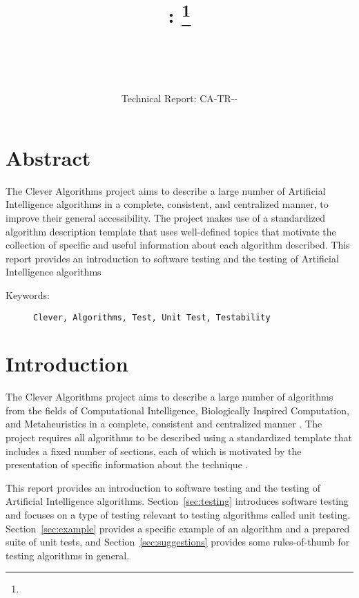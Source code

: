 \documentclass[a4paper, 11pt]{article}
\title{{\myreporttitle}: {\myreportsubtitle}\footnote{\myreportlicense}}
\author{\myreportauthor\\{\myreportemail}\\\small\myreportproject}
\date{\myreportfulldate\\{\small{Technical Report: CA-TR-{\myreportdate}-\myreportversion}}}
\begin{document}
\maketitle

\section*{Abstract} 
The Clever Algorithms project aims to describe a large number of Artificial Intelligence algorithms in a complete, consistent, and centralized manner, to improve their general accessibility. 
The project makes use of a standardized algorithm description template that uses well-defined topics that motivate the collection of specific and useful information about each algorithm described.
This report provides an introduction to software testing and the testing of Artificial Intelligence algorithms

\begin{description}
	\item[Keywords:] {\small\texttt{Clever, Algorithms, Test, Unit Test, Testability}}
\end{description} 

\section{Introduction}
\label{sec:introduction}
The Clever Algorithms project aims to describe a large number of algorithms from the fields of Computational Intelligence, Biologically Inspired Computation, and Metaheuristics in a complete, consistent and centralized manner \cite{Brownlee2010}.
The project requires all algorithms to be described using a standardized template that includes a fixed number of sections, each of which is motivated by the presentation of specific information about the technique \cite{Brownlee2010a}.

This report provides an introduction to software testing and the testing of Artificial Intelligence algorithms. Section~\ref{sec:testing} introduces software testing and focuses on a type of testing relevant to testing algorithms called unit testing. Section~\ref{sec:example} provides a specific example of an algorithm and a prepared suite of unit tests, and Section~\ref{sec:suggestions} provides some rules-of-thumb for testing algorithms in general.
\end{document}
